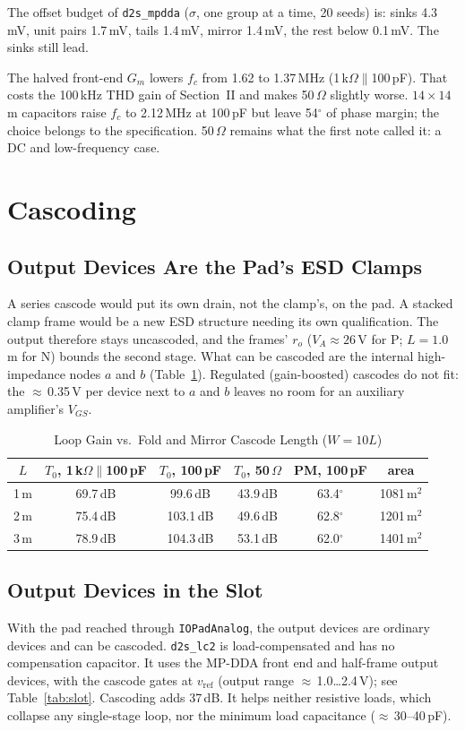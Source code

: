 \documentclass[journal]{IEEEtran}
\newcommand{\cell}[1]{\texttt{#1}}
\newcommand{\um}{\,\textmu m}
\newcommand{\umsq}{\,\textmu m$^2$}
\newcommand{\mV}{\,mV}
\newcommand{\dB}{\,dB}
\newcommand{\MHz}{\,MHz}
\newcommand{\pF}{\,pF}
\newcommand{\Ohm}{\,$\Omega$}
\newcommand{\dg}{$^\circ$}
\newcommand{\RL}{1\,k$\Omega\parallel$100\,pF}
\newcommand{\vref}{v_\mathrm{ref}}
\begin{document}
The offset budget of \cell{d2s\_mpdda} ($\sigma$, one group at a time, 20 seeds) is:
sinks 4.3\mV, unit pairs 1.7\mV, tails 1.4\mV, mirror 1.4\mV, the rest below 0.1\mV. The
sinks still lead.

The halved front-end $G_m$ lowers $f_c$ from 1.62 to 1.37\MHz{} (\RL). That costs the
100\,kHz THD gain of Section~II and makes 50\Ohm{} slightly worse. $14\times14$\um{}
capacitors raise $f_c$ to 2.12\MHz{} at 100\pF{} but leave 54\dg{} of phase margin; the
choice belongs to the specification. 50\Ohm{} remains what the first note called it: a DC
and low-frequency case.

\section{Cascoding}
\label{sec:casc}

\subsection{Output Devices Are the Pad's ESD Clamps}
A series cascode would put its own drain, not the clamp's, on the pad. A stacked clamp frame
would be a new ESD structure needing its own qualification. The output therefore stays
uncascoded, and the frames' $r_o$ ($V_A\approx26$\,V for P; $L=1.0$\um{} for N) bounds the
second stage. What can be cascoded are the internal high-impedance nodes $a$ and $b$
(Table~\ref{tab:lcas}). Regulated (gain-boosted) cascodes do not fit: the $\approx$\,0.35\,V
per device next to $a$ and $b$ leaves no room for an auxiliary amplifier's $V_{GS}$.

\begin{table}[!t]
\caption{Loop Gain vs.\ Fold and Mirror Cascode Length ($W=10L$)}
\label{tab:lcas}
\centering\footnotesize\setlength{\tabcolsep}{4pt}
\begin{tabular}{@{}cccccc@{}}
\toprule
$L$ & $T_0$, \RL & $T_0$, 100\pF & $T_0$, 50\Ohm & PM, 100\pF & area\\
\midrule
1\um & 69.7\dB & 99.6\dB & 43.9\dB & 63.4\dg & 1081\umsq\\
2\um & 75.4\dB & 103.1\dB & 49.6\dB & 62.8\dg & 1201\umsq\\
3\um & 78.9\dB & 104.3\dB & 53.1\dB & 62.0\dg & 1401\umsq\\
\bottomrule
\end{tabular}
\end{table}

\subsection{Output Devices in the Slot}
With the pad reached through \cell{IOPadAnalog}, the output devices are ordinary devices and
can be cascoded. \cell{d2s\_lc2} is load-compensated and has no compensation capacitor. It
uses the MP-DDA front end and half-frame output devices, with the cascode gates at $\vref$
(output range $\approx$\,1.0\ldots2.4\,V); see Table~\ref{tab:slot}. Cascoding adds 37\dB.
It helps neither resistive loads, which collapse any single-stage loop, nor the minimum load
capacitance ($\approx$\,30--40\pF).
\end{document}
